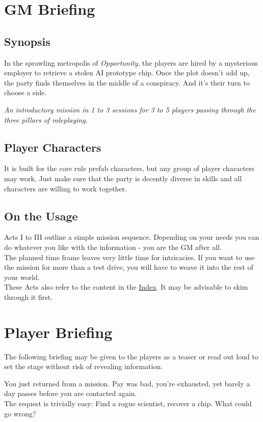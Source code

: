 \chapter{GM Briefing}
\section{Synopsis}
In the sprawling metropolis of \emph{Opportunity},
	the players are hired by a mysterious employer to retrieve a stolen AI prototype chip.
Once the plot doesn't add up,
	the party finds themselves in the middle of a conspiracy.
And it's their turn to choose a side.
\par
{
	\itshape
	An introductory mission
	in 1 to 3 sessions
	for 3 to 5 players
	passing through the three pillars of roleplaying.
}
\section{Player Characters}
It is built for the core rule prefab characters,
but any group of player characters may work.
Just make sure that the party is decently diverse in skills
and all characters are willing to work together.
\section{On the Usage}
Acts I to III outline a simple mission sequence.
Depending on your needs you can do whatever you like with the information
	- you are the GM after all.
\\%
The planned time frame leaves very little time for intricacies.
If you want to use the mission for more than a test drive,
	you will have to weave it into the rest of your world.
\\%
These Acts also refer to the content in the \hyperref[ch:index]{Index}.
It may be advisable to skim through it first.

\chapter{Player Briefing}
\begin{exampleblock}
	The following briefing may be given to the players as a teaser
		or read out loud to set the stage
		without risk of revealing information.
\end{exampleblock}
You just returned from a mission.
Pay was bad, you're exhausted,
yet barely a day passes before you are contacted again.
\\%
The request is trivially easy:
Find a rogue scientist, recover a chip.
What could go wrong?

